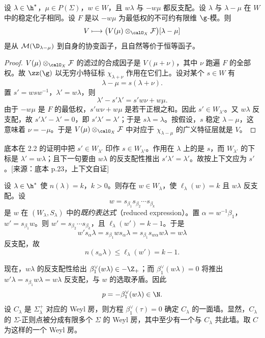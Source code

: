 \begin{lemma}\label{lem:02.2.2.2}
设 $\lambda\in\h^*$，$\mu\in P(\Sigma)$，$w\in W$，且 $w\lambda$ 与 $-w\mu$ 都反支配。设 $\lambda$ 与 $\lambda-\mu$ 在 $W$ 中的稳定化子相同。设 $F$ 是以 $-w\mu$ 为最低权的不可约有限维 $\g$-模。则
$$V\longmapsto\bigl(V(\mu)\otimes_{\calO_X}\mathcal{F}\bigr)[\lambda-\mu]$$
是从 $\mathcal{M}(\D_{\lambda-\mu})$ 到自身的协变函子，且自然等价于恒等函子。
\end{lemma}

\begin{proof}
$V(\mu)\otimes_{\calO_X}\mathcal{F}$ 的滤过的合成因子是 $V(\mu+\nu)$，其中 $\nu$ 跑遍 $F$ 的全部权。故 $\zz(\g)$ 以无穷小特征标 $\chi_{\lambda+\nu}$ 作用在它们上。设对某个 $s\in W$ 有
$$\lambda-\mu=s(\lambda+\nu).$$
置 $s'=wsw^{-1}$，$\lambda'=w\lambda$，则
$$\lambda'-s'\lambda'=s'w\nu+w\mu.$$
由于 $-w\mu$ 是 $F$ 的最低权，$s'w\nu+w\mu$ 是若干正根之和。因此 $s'\in W_{\lambda'}$。又 $w\lambda$ 反支配，故 $s'\lambda'-\lambda'=0$，即 $s'\lambda'=\lambda'$；于是 $s\lambda=\lambda$。按假设，$s$ 稳定 $\lambda-\mu$，这意味着 $\nu=-\mu$。于是 $V(\mu)\otimes_{\calO_X}\mathcal{F}$ 中对应于 $\chi_{\lambda-\mu}$ 的广义特征层就是 $V$。
\end{proof}
\begin{annote}
底本在 2.2 的证明中把 $s'\in W_{\lambda'}$ 印作 $s\in W_{\lambda'}$。作用在 $\lambda$ 上的是 $s$，而 $W_{\lambda'}$ 的下标是 $\lambda'=w\lambda$；且下一句要由 $w\lambda$ 的反支配性推出 $s'\lambda'=\lambda'$。故按上下文应为 $s'$。[来源：底本 p.23，上下文自证]
\end{annote}

设 $\lambda\in\h^*$ 使 $n(\lambda)=k$，$k>0$。则存在 $w\in W_\lambda$，使 $\ell_\lambda(w)=k$ 且 $w\lambda$ 反支配。设
$$w=s_{\beta_1}s_{\beta_2}\cdots s_{\beta_k}$$
是 $w$ 在 $(W_\lambda,S_\lambda)$ 中的\emph{既约表达式}（reduced expression）。置 $\alpha=w^{-1}\beta_1$，$w'=s_{\beta_1}w$。则 $w'=s_{\beta_2}\cdots s_{\beta_k}$，且 $\ell_\lambda(w')=k-1$。于是
$$w's_\alpha\lambda=s_{\beta_1}ws_\alpha\lambda=s_{\beta_1}s_{w\alpha}w\lambda=w\lambda$$
反支配，故
$$n(s_\alpha\lambda)\le\ell_\lambda(w')=k-1.$$

现在，$w\lambda$ 的反支配性给出 $\beta_1^\vee(w\lambda)\in-\Z_+$；而 $\beta_1^\vee(w\lambda)=0$ 将推出 $w'\lambda=s_{\beta_1}w\lambda=w\lambda$ 反支配，与 $w$ 的选取矛盾。因此
$$p=-\beta_1^\vee(w\lambda)\in\N.$$
设 $C_\lambda$ 是 $\Sigma_\lambda^+$ 对应的 Weyl 房，则方程 $\beta_1^\vee(\tau)=0$ 确定 $C_\lambda$ 的一面墙。显然，$C_\lambda$ 的 $\Sigma$-正则点被分成有限多个 $\Sigma$ 的 Weyl 房，其中至少有一个与 $C_\lambda$ 共此墙。取 $C$ 为这样的一个 Weyl 房。

